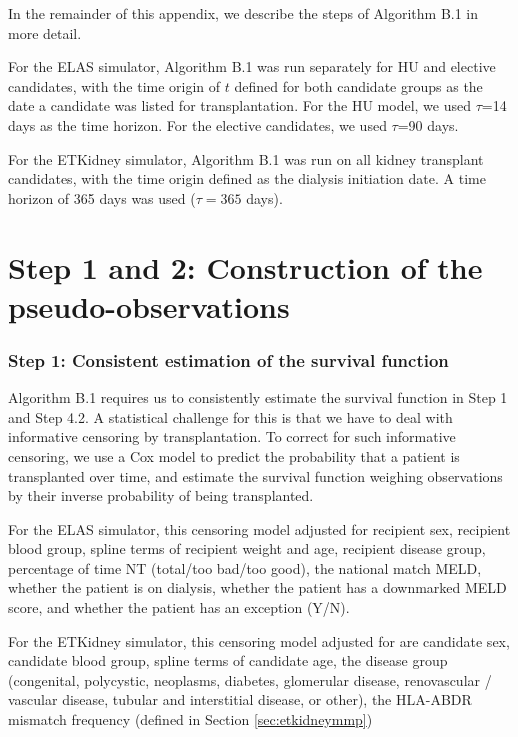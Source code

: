 \documentclass[11pt,twoside,]{book}
\begin{document}
In the remainder of this appendix, we describe the steps of Algorithm B.1 in more detail.

For the ELAS simulator, Algorithm B.1 was run separately
for HU and elective candidates, with the time origin of \(t\) defined for both
candidate groups as the date a
candidate was listed for transplantation. For the HU model, we used \(\tau\)=14 days as the time horizon. For the elective candidates, we used \(\tau\)=90 days.

For the ETKidney simulator, Algorithm B.1 was run on all kidney
transplant candidates, with the time origin defined as the dialysis initiation date. A time horizon of 365 days was used (\(\tau=365\) days).

\newpage

\section{Step 1 and 2: Construction of the pseudo-observations}\label{step-1-and-2-construction-of-the-pseudo-observations}

\subsubsection*{Step 1: Consistent estimation of the survival function}\label{step-1-consistent-estimation-of-the-survival-function}

Algorithm B.1 requires us to consistently estimate the survival function in Step
1 and Step 4.2. A statistical challenge for this is that we have to deal with
informative censoring by transplantation. To correct for such informative
censoring, we use a Cox
model to predict the probability that a patient is transplanted over time,
and estimate the survival function weighing observations by their inverse probability of being transplanted.

For the ELAS simulator, this censoring model adjusted for recipient sex,
recipient blood group, spline terms of recipient weight and age, recipient
disease group, percentage of time NT (total/too bad/too good), the national
match MELD, whether the patient is on dialysis, whether the patient has a downmarked
MELD score, and whether the patient has an exception (Y/N).

For the ETKidney simulator, this censoring model adjusted for are candidate sex,
candidate blood group, spline terms of candidate age, the disease group (congenital,
polycystic, neoplasms, diabetes, glomerular disease, renovascular / vascular disease,
tubular and interstitial disease, or other), the HLA-ABDR mismatch frequency
(defined in Section \ref{sec:etkidneymmp})
\end{document}
